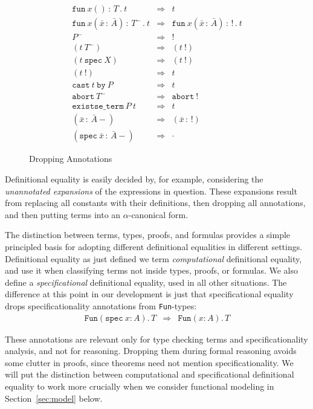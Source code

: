 \documentclass[9pt,natbib]{sigplanconf}
\newcommand{\bang}[0]{\texttt{!}}
\newcommand{\To}{\Rightarrow}
\begin{document}
\begin{figure}
\[
\begin{array}{lll} 
\texttt{fun}\ x()\, :\, T\, .\ t & \To & t \\
\texttt{fun}\ x(\bar{x}\,:\,\bar{A})\, :\, T^-\, .\ t & \To &
\texttt{fun}\ x(\bar{x}\,:\,\bar{A})\, :\, \bang\, .\ t \\
P^- & \To & \bang \\
(t\ T^-) & \To & (t\ \bang) \\
(t\ \texttt{spec}\ X) & \To & (t\ \bang) \\
(t\ \bang) & \To & t \\
\texttt{cast}\ t\ \texttt{by}\ P & \To & t \\
\texttt{abort}\ T^- & \To & \texttt{abort}\ \bang \\
\texttt{existse\_term}\ P\ t & \To & t \\
(\bar{x}\,:\,\bar{A}-) & \To & (\bar{x}\,:\,\bang) \\
(\texttt{spec}\ \bar{x}\,:\,\bar{A}-) & \To & \cdot
\end{array}
\]
\caption{\label{fig:dropannos}Dropping Annotations}
\end{figure}

Definitional equality is easily decided by, for example, considering
the \emph{unannotated expansions} of the expressions in question.
These expansions result from replacing all constants with their
definitions, then dropping all annotations, and then putting terms
into an $\alpha$-canonical form.

The distinction between terms, types, proofs, and formulas provides a
simple principled basis for adopting different definitional equalities
in different settings.  Definitional equality as just defined we term
\emph{computational} definitional equality, and use it when
classifying terms not inside types, proofs, or formulas.  We also
define a \emph{specificational} definitional equality, used in all
other situations.  The difference at this point in our development is
just that specificational equality drops specificationality
annotations from \texttt{Fun}-types:
\[
\begin{array}{lll} 
\texttt{Fun}(\texttt{spec}\ x:A).\,T & \To & 
\texttt{Fun}(x:A).\,T 
\end{array}
\]

\noindent These annotations are relevant only for type checking terms
and specificationality analysis, and not for reasoning.  Dropping them
during formal reasoning avoids some clutter in proofs, since theorems
need not mention specificationality.  We will put the distinction
between computational and specificational definitional equality to
work more crucially when we consider functional modeling in
Section~\ref{sec:model} below.
\end{document}
